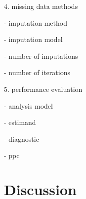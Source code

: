 \documentclass[bimj,fleqn]{w-art}
\begin{document}
4. missing data methods

- imputation method

- imputation model

- number of imputations

- number of iterations

5. performance evaluation

- analysis model

- estimand

- diagnostic

- ppc



\section{Discussion}


\begin{acknowledgement}
\end{acknowledgement}
\vspace*{1pc}



% 
% 




\end{document}
